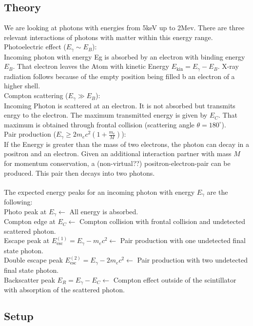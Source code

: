 \documentclass[a4paper,12pt]{article}
\begin{document}
\subsection{Theory}
We are looking at photons with energies from 5keV up to 2Mev. There are three relevant interactions of photons with matter within this energy range.\\
Photoelectric effect ($E_\gamma \sim E_B$):\\
Incoming photon with energy Eg is absorbed by an electron with binding energy $E_B$. That electron leaves the Atom with kinetic Energy $E_{\mathrm{kin}} = E_\gamma - E_B$. X-ray radiation follows because of the empty position being filled b an electron of a higher shell.\\
Compton scattering ($E_\gamma \gg E_B$):\\
Incoming Photon is scattered at an electron. It is not absorbed but transmits enrgy to the electron. The maximum transmitted energy is given by $E_C$. That maximum is obtained through frontal collision (scattering angle $\theta = 180^\circ$).\\
Pair production ($E_\gamma \geqslant 2m_ec^2(1+\frac{m_e}{M})$):\\
If the Energy is greater than the mass of two electrons, the photon can decay in a positron and an electron. Given an additional interaction partner with mass $M$ for momentum conservation, a (non-virtual??) positron-electron-pair can be produced. This pair then decays into two photons.\\
\\
The expected energy peaks for an incoming photon with energy $E_\gamma$ are the following:\\
Photo peak at $E_\gamma \leftarrow$ All energy is absorbed.\\
Compton edge at $E_C \leftarrow$ Compton collision with frontal collision and undetected scattered photon.\\
Escape peak at $E_\mathrm{esc}^{(1)} = E_\gamma - m_ec^2 \leftarrow$ Pair production with one undetected final state photon.\\
Double escape peak $E_\mathrm{esc}^{(2)} = E_\gamma - 2m_ec^2 \leftarrow$ Pair production with two undetected final state photon.\\
Backscatter peak $E_R = E_\gamma - E_C \leftarrow$ Compton effect outside of the scintillator with absorption of the scattered photon.\\

\subsection{Setup}
\end{document}
